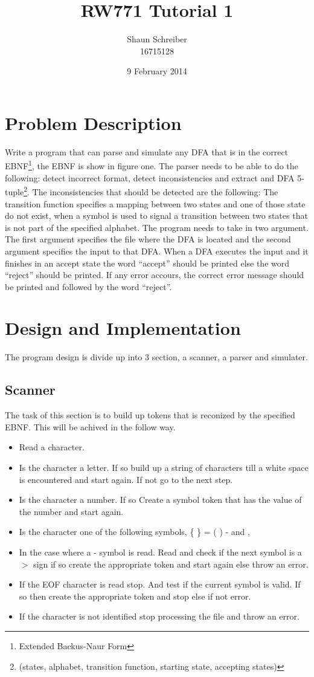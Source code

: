 \documentclass[a4paper, 10pt]{article}
\author{Shaun Schreiber\\16715128}
\date{9 February 2014}
\title{RW771 Tutorial 1}
\begin{document}
\maketitle
\section{Problem Description}
Write a program that can parse and simulate any DFA that is in the correct EBNF\footnote{Extended Backus-Naur Form}, the EBNF is show in figure one.  
The parser needs to be able to do the following: detect incorrect format, detect inconsistencies and extract and DFA 5-tuple\footnote{(states, alphabet, 
transition function, starting state, accepting states)}. 
The inconsistencies that should be detected are the following: The transition function specifies a mapping between two states and one of those 
state do not exist, when a symbol is used to signal a transition between two states that is not part of the specified alphabet.
The program needs to take in two argument. The first argument specifies the file where the DFA is located and 
the second argument specifies the input to that DFA. When a DFA executes the input and it finishes in an accept state the word ``accept'' should be printed else the word ``reject'' should be printed. If any error accours, the correct error message should be printed and followed by the word ``reject''.
\section{Design and Implementation}
The program design is divide up into 3 section, a scanner, a parser and simulater.
\subsection{Scanner}
The task of this section is to build up tokens that is reconized by the specified EBNF.
This will be achived in the follow way.
\begin{itemize}
\item Read a character.
\item Is the character a letter. If so build up a string of characters till a white space is encountered and start again. If not go to the next step.
\item Is the character a number. If so Create a symbol token that has the value of the number and start again.
\item Is the character one of the following symbols, \{ \} = ( ) - and ,
\item In the case where a - symbol is read. Read and check if the next symbol is a $>$ sign if so create the appropriate token and start again 
else throw an error.
\item If the EOF character is read stop. And test if the current symbol is valid. If so then create the appropriate token and stop else if not error.
\item If the character is not identified stop processing the file and throw an error.
\end{itemize}
\end{document}
